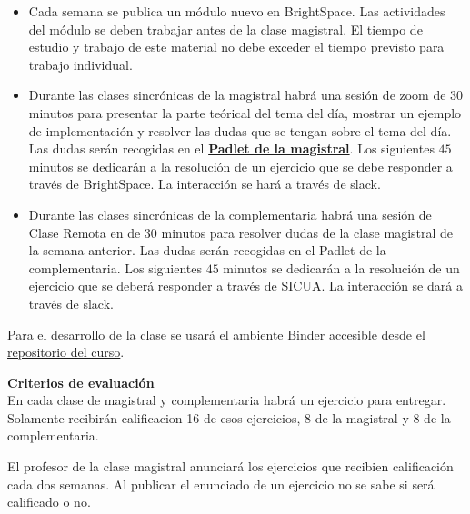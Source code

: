 \documentclass[letterpaper,10pt,onecolumn]{article}
\begin{document}
\begin{itemize}
    \item Cada semana se publica un m\'odulo nuevo en BrightSpace. 
      Las actividades del m\'odulo se deben trabajar antes de la clase magistral. 
      El tiempo de estudio y trabajo de este material no debe exceder
      el tiempo previsto para trabajo individual. 
    \item Durante las clases sincr\'onicas de la magistral habr\'a una
      sesi\'on de zoom de $30$ minutos para presentar la parte
      te\'orical del tema del d\'ia, mostrar un ejemplo de implementaci\'on
      y resolver las dudas que se tengan sobre el tema
      del d\'ia.
      Las dudas ser\'an recogidas en el 
      \textbf{\href{https://uniandes.padlet.org/jeforero/dddxuuqa7q4cadgs}{Padlet
        de la magistral}}.
      Los siguientes $45$ minutos se dedicar\'an a la resoluci\'on de
      un ejercicio que se debe responder a trav\'es de BrightSpace. La
      interacci\'on se har\'a a trav\'es de slack. 
    \item
      Durante las clases sincr\'onicas de la complementaria habr\'a
      una sesi\'on de Clase Remota en de
      $30$ minutos para resolver dudas de la clase magistral de la
      semana anterior.
      Las dudas ser\'an recogidas en el Padlet
        de la complementaria.
      Los siguientes $45$ minutos se dedicar\'an a la resoluci\'on de
      un ejercicio que se deber\'a responder a trav\'es de SICUA. 
      La interacci\'on se dar\'a a trav\'es de slack. 
\end{itemize}

Para el desarrollo de la clase se usará el ambiente Binder accesible
desde el
\href{https://github.com/ComputoCienciasUniandes/MetComp1_202110}{repositorio
  del curso}. 




\vspace*{0.5cm} 
\noindent\textbf{\large {} \quad Criterios de
  evaluaci\'on}\\[-0.2cm] 

En cada clase de magistral y complementaria habr\'a un ejercicio para
entregar. 
Solamente recibir\'an calificacion 16 de esos
ejercicios, 8 de la magistral y 8 de la complementaria.

El profesor de la clase magistral anunciar\'a los ejercicios que
recibien calificaci\'on cada dos semanas.
Al publicar el enunciado de un ejercicio no se sabe si ser\'a
calificado o no.
\end{document}
